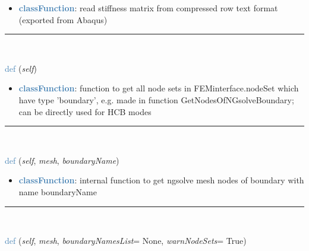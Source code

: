 \begin{itemize}[leftmargin=1.4cm]
\begin{itemize}[leftmargin=1.4cm]
\begin{itemize}[leftmargin=1.4cm]
\begin{itemize}[leftmargin=0.5cm]
\begin{itemize}[leftmargin=1.4cm]
\begin{itemize}[leftmargin=1.4cm]
\begin{itemize}[leftmargin=1.4cm]
\begin{itemize}[leftmargin=0.5cm]
\setlength{\itemindent}{0.7cm}
\begin{itemize}[leftmargin=0.7cm]
\item[--]\textcolor{steelblue}{\bf classFunction}: read stiffness matrix from compressed row text format (exported from Abaqus)
\vspace{12pt}\end{itemize}
%
\noindent\rule{8cm}{0.75pt}\vspace{1pt} \\ 
\begin{flushleft}
\noindent \textcolor{steelblue}{def {\bf {}}}\label{sec:FEM:FEMinterface:GetBoundaryNodeSetsAsLists}
({\it self})
\end{flushleft}
\setlength{\itemindent}{0.7cm}
\begin{itemize}[leftmargin=0.7cm]
\item[--]\textcolor{steelblue}{\bf classFunction}: function to get all node sets in FEMinterface.nodeSet which have type 'boundary', e.g. made in function GetNodesOfNGsolveBoundary; can be directly used for HCB modes
\vspace{12pt}\end{itemize}
%
\noindent\rule{8cm}{0.75pt}\vspace{1pt} \\ 
\begin{flushleft}
\noindent \textcolor{steelblue}{def {\bf {}}}\label{sec:FEM:FEMinterface:GetNodesOfNGsolveBoundary}
({\it self}, {\it mesh}, {\it boundaryName})
\end{flushleft}
\setlength{\itemindent}{0.7cm}
\begin{itemize}[leftmargin=0.7cm]
\item[--]\textcolor{steelblue}{\bf classFunction}: internal function to get ngsolve mesh nodes of boundary with name boundaryName
\vspace{12pt}\end{itemize}
%
\noindent\rule{8cm}{0.75pt}\vspace{1pt} \\ 
\begin{flushleft}
\noindent \textcolor{steelblue}{def {\bf {}}}\label{sec:FEM:FEMinterface:CreateNGsolveBoundaryNodeSets}
({\it self}, {\it mesh}, {\it boundaryNamesList}= None, {\it warnNodeSets}= True)

\end{flushleft}
\end{itemize}
\end{itemize}
\end{itemize}
\end{itemize}
\end{itemize}
\end{itemize}
\end{itemize}
\end{itemize}
